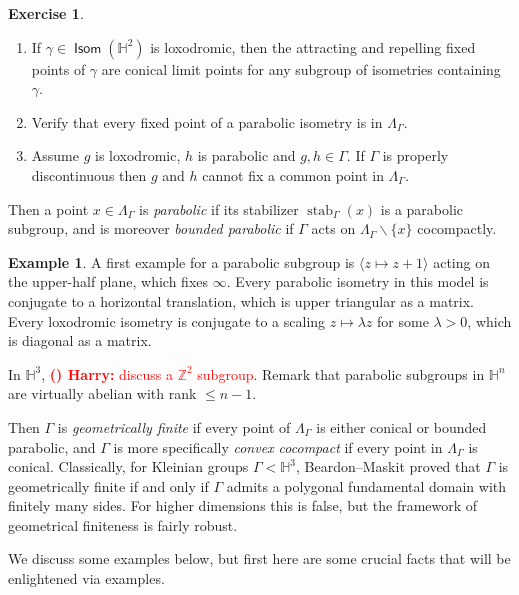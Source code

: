\documentclass[11pt]{amsart}
\theoremstyle{plain}
\theoremstyle{definition}
\newtheorem{example}[proposition]{Example}
\newtheorem{exercise}[proposition]{Exercise}
\theoremstyle{remark}
\DeclareMathOperator{\stab}{stab}
\DeclareMathOperator{\Isom}{\mathsf{Isom}}
\newcounter{countharry}
\newcommand{\comharry}[1]{{\textcolor{red}{\textrm{{\bf (\arabic{countharry})\stepcounter{countharry} Harry:} #1}}}}
\begin{document}
\begin{exercise}
  \begin{enumerate}
    \item 
      If $\gamma\in\Isom(\mathbb H^2)$ is
      loxodromic, then the attracting and repelling fixed points of $\gamma$ are
      conical limit points for any subgroup of isometries containing $\gamma$. 
    \item 
      Verify that every fixed point of a parabolic
      isometry is in $\Lambda_\Gamma$. 
    \item Assume $g$ is loxodromic, $h$ is parabolic and
      $g,h\in\Gamma$. If 
      $\Gamma$ is properly discontinuous then 
      $g$ and $h$ cannot fix a common point in $\Lambda_\Gamma$. 
  \end{enumerate}

\end{exercise}
Then a point $x\in\Lambda_\Gamma$ is {\em parabolic} if its stabilizer
$\stab_\Gamma(x)$ is a parabolic subgroup, and is moreover {\em bounded
parabolic} if $\Gamma$ acts on $\Lambda_\Gamma\smallsetminus\{x\}$
cocompactly. 

\begin{example}
A first example for a parabolic subgroup is $\langle z\mapsto z+1\rangle$
acting on the upper-half plane, which fixes $\infty$. Every
parabolic isometry in this model is conjugate to a horizontal translation,
which is upper triangular as a matrix. 
Every loxodromic isometry is conjugate to a scaling $z\mapsto \lambda
z$ for some $\lambda>0$, which is diagonal as a matrix. 

In $\mathbb H^3$, \comharry{discuss a $\mathbb Z^2$ subgroup}. Remark that
parabolic subgroups in $\mathbb H^n$ are virtually abelian with rank
$\leq n-1$. 
\end{example}


Then $\Gamma$ is {\em geometrically finite} if every point of
$\Lambda_\Gamma$ is either conical or bounded parabolic, and $\Gamma$ is
more specifically {\em convex cocompact} if every point in $\Lambda_\Gamma$
is conical. 
Classically, for Kleinian groups $\Gamma<\mathbb H^3$, Beardon--Maskit
proved that $\Gamma$ is geometrically finite if and only if $\Gamma$ admits
a polygonal fundamental domain with finitely many sides. For higher
dimensions this is false, but the framework of geometrical finiteness is
fairly robust.  

We discuss some examples below, but first here are some crucial facts that
will be enlightened via examples. 
\end{document}
